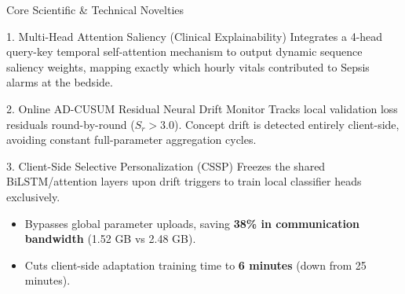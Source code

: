 \documentclass[aspectratio=169, 11pt]{beamer}
\begin{document}
\begin{frame}{Core Scientific \& Technical Novelties}
    \begin{alertblock}{1. Multi-Head Attention Saliency (Clinical Explainability)}
        \scriptsize
        Integrates a 4-head query-key temporal self-attention mechanism to output dynamic sequence saliency weights, mapping exactly which hourly vitals contributed to Sepsis alarms at the bedside.
    \end{alertblock}
    
    \begin{alertblock}{2. Online AD-CUSUM Residual Neural Drift Monitor}
        \scriptsize
        Tracks local validation loss residuals round-by-round ($S_r > 3.0$). Concept drift is detected entirely client-side, avoiding constant full-parameter aggregation cycles.
    \end{alertblock}
    
    \begin{alertblock}{3. Client-Side Selective Personalization (CSSP)}
        \scriptsize
        Freezes the shared BiLSTM/attention layers upon drift triggers to train local classifier heads exclusively.
        \begin{itemize}
            \scriptsize
            \item Bypasses global parameter uploads, saving \textbf{38\% in communication bandwidth} (1.52 GB vs 2.48 GB).
            \item Cuts client-side adaptation training time to \textbf{6 minutes} (down from 25 minutes).
        \end{itemize}
    \end{alertblock}
\end{frame}
\end{document}
